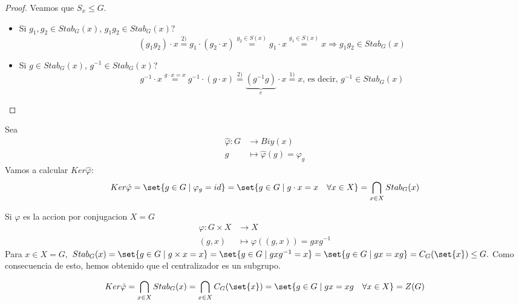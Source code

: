 \begin{proof}
	Veamos que \(S_x \leq G \).
	\begin{itemize}
		\item Si \(g_1, g_2 \in Stab_G(x )\), \(g_1 g_2 \in Stab_G(x)\)?
		      \[
			      (g_1 g_2) \cdot x \overset{2)}{=} g_1 \cdot (g_2 \cdot x) \overset{g_2 \in S(x)}{=} g_1 \cdot x \overset{g_1 \in S(x)}{=} x \Rightarrow g_{1} g_2 \in Stab_G(x )
		      \]
		\item Si \(g \in Stab_G(x )\), \(g^{-1} \in Stab_G (x)\)?
		      \[
			      g^{-1} \cdot x \overset{g \cdot x = x}{=} g^{-1} \cdot (g \cdot x) \overset{2)}{=} \underbrace{(g^{-1} g)}_{e} \cdot x \overset{1)}{=} x \text{, es decir, } g^{-1} \in Stab_G (x)
		      \]
	\end{itemize}
\end{proof}
Sea
\[
	\begin{aligned}
		\hat{\varphi} \colon G & \longrightarrow Biy(x )                     \\
		g                      & \longmapsto \hat{\varphi} (g ) = \varphi_g
	\end{aligned}
\]
Vamos a calcular \(Ker \hat{\varphi}\):
\[
	Ker \hat{\varphi} = \set{g \in G \mid \varphi_g = id} = \set{g \in G \mid g \cdot x = x \quad \forall x \in X} = \bigcap_{x \in X} Stab_G(x)
\]
\begin{example}
	Si \(\varphi\) es la accion por conjugacion \(X = G \)
	\[
		\begin{aligned}
			\varphi\colon G \times X & \longrightarrow X                        \\
			(g, x )                  & \longmapsto \varphi((g, x )) = gx g^{-1}
		\end{aligned}
	\]
	Para \(x \in X = G ,\) \(Stab_G(x) = \set{g \in G \mid g \times x = x } = \set{g \in G \mid g x g^{-1} = x } = \set{g \in G \mid gx = xg} = C_{G}(\set{x}) \leq G .\) Como consecuencia de esto, hemos obtenido que el centralizador es un subgrupo.
	
	\[
		Ker \hat{\varphi} = \bigcap_{x\in X} Stab_G (x) = \bigcap_{x \in X} C_G (\set{x}) = \set{g \in G \mid gx = xg \quad \forall x \in X} = Z(G)
	\]
\end{example}


